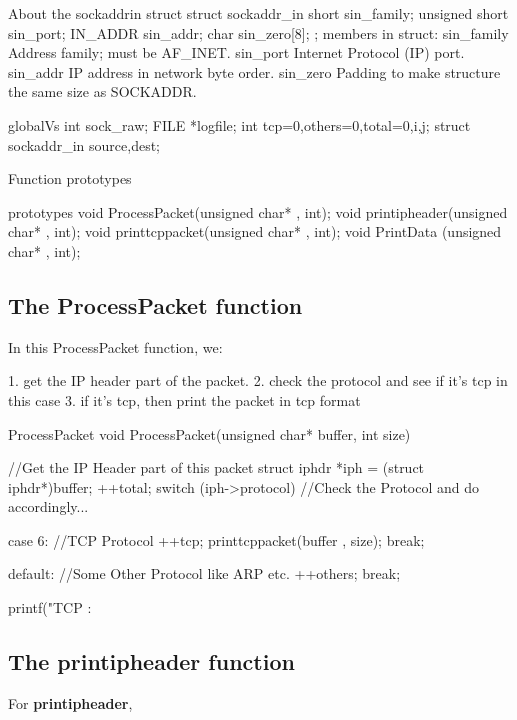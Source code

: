 \begin{chunk}{About the sockaddrin struct}
struct sockaddr_in{
  short sin_family;
  unsigned short sin_port;
  IN_ADDR sin_addr;
  char sin_zero[8];
};
members in struct:
sin_family
    Address family; must be AF_INET.
sin_port
    Internet Protocol (IP) port.
sin_addr
    IP address in network byte order.
sin_zero
    Padding to make structure the same size as SOCKADDR.
\end{chunk}

\begin{chunk}{globalVs}
int sock_raw;
FILE *logfile;
int tcp=0,others=0,total=0,i,j;
struct sockaddr_in source,dest;

\end{chunk}

\noindent
Function prototypes
\begin{chunk}{prototypes}
void ProcessPacket(unsigned char* , int);
void printipheader(unsigned char* , int);
void printtcppacket(unsigned char* , int);
void PrintData (unsigned char* , int);

\end{chunk}

\subsection{The ProcessPacket function}
\noindent
In this ProcessPacket function, we:

1. get the IP header part of the packet.
2. check the protocol and see if it's tcp in this case
3. if it's tcp, then print the packet in tcp format

\begin{chunk}{ProcessPacket}
void ProcessPacket(unsigned char* buffer, int size)
{
    //Get the IP Header part of this packet
    struct iphdr *iph = (struct iphdr*)buffer;
    ++total;
    switch (iph->protocol) //Check the Protocol and do accordingly...
    { 
        case 6:  //TCP Protocol
            ++tcp;
            printtcppacket(buffer , size);
            break;
         
        default: //Some Other Protocol like ARP etc.
            ++others;
            break;
    }
    printf("TCP : %
}

\end{chunk}

\subsection{The printipheader function}
For {\bf printipheader}, 

